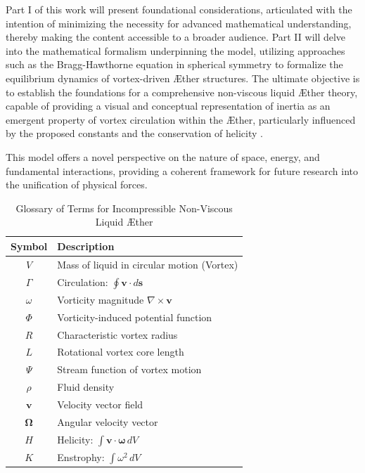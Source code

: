 \documentclass[a4paper,10pt]{article}
\begin{document}
    Part I of this work will present foundational considerations, articulated with the intention of minimizing the necessity for advanced mathematical understanding, thereby making the content accessible to a broader audience. Part II will delve into the mathematical formalism underpinning the model, utilizing approaches such as the Bragg-Hawthorne equation in spherical symmetry \cite{keller2024} to formalize the equilibrium dynamics of vortex-driven Æther structures. The ultimate objective is to establish the foundations for a comprehensive non-viscous liquid Æther theory, capable of providing a visual and conceptual representation of inertia as an emergent property of vortex circulation within the Æther, particularly influenced by the proposed constants and the conservation of helicity \cite{kleckner2016}.





    This model offers a novel perspective on the nature of space, energy, and fundamental interactions, providing a coherent framework for future research into the unification of physical forces.

        \begin{table}[h]
            \centering
            \renewcommand{\arraystretch}{1.3}
            \begin{tabular}{c l}
                \toprule
                Symbol & Description \\
                \midrule
                \( V \) & Mass of liquid in circular motion (Vortex) \\
                \( \Gamma \) & Circulation: \( \oint \mathbf{v} \cdot d\mathbf{s} \) \\
                \( \omega \) & Vorticity magnitude \(\nabla \times \mathbf{v} \) \\
                \( \Phi \) & Vorticity-induced potential function \\
                \( R \) & Characteristic vortex radius \\
                \( L \) & Rotational vortex core length \\
                \( \Psi \) & Stream function of vortex motion \\
                \( \rho \) & Fluid density \\
                \( \mathbf{v} \) & Velocity vector field \\
                \( \mathbf{\Omega} \) & Angular velocity vector \\
                \( H \) & Helicity: \( \int \mathbf{v} \cdot \mathbf{\omega} \, dV \) \\
                \( K \) & Enstrophy: \( \int \omega^2 \, dV \) \\
                \bottomrule
            \end{tabular}
            \caption{Glossary of Terms for Incompressible Non-Viscous Liquid Æther}
            \label{tab:notation}
        \end{table}
\end{document}
